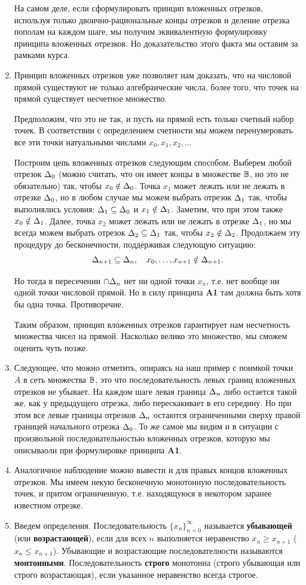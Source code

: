 \begin{enumerate}
На самом деле, если сформулировать принцип вложенных отрезков, используя только двоично-рациональные концы отрезков и деление отрезка пополам на каждом шаге, мы получим эквивалентную формулировку принципа вложенных отрезков. Но доказательство этого факта мы оставим за рамками курса.
\item Принцип вложенных отрезков уже позволяет нам доказать, что на числовой прямой существуют не только алгебраические числа, более того, что точек на прямой существует несчетное множество.

Предположим, что это не так, и пусть на прямой есть только счетный набор точек. В соответствии с определением счетности мы можем перенумеровать все эти точки натуальными числами $x_0,x_1,x_2,\dots$

Построим цепь вложенных отрезков следующим способом. Выберем любой отрезок $\Delta_0$ (можно считать, что он имеет концы в множестве $\mathbb B$, но это не обязательно) так, чтобы $x_0\notin\Delta_0$. Точка $x_1$ может лежать или не лежать в отрезке $\Delta_0$, но в любом случае мы можем выбрать отрезок $\Delta_1$ так, чтобы выполнялись условия: $\Delta_1\subseteq\Delta_0$ и $x_1\notin\Delta_1$. Заметим, что при этом также $x_0\notin\Delta_1$. Далее, точка $x_2$ может лежать или не лежать в отрезке $\Delta_1$, но мы всегда можем выбрать отрезок $\Delta_2\subseteq\Delta_1$ так, чтобы $x_2\notin\Delta_2$. Продолжаем эту процедуру до бесконечности, поддерживая следующую ситуацию:
$$
\Delta_{n+1}\subseteq\Delta_n,\quad x_0,\dots,x_{n+1}\notin\Delta_{n+1}.
$$

Но тогда в пересечении $\cap\Delta_n$ нет ни одной точки $x_n$, т.е. нет вообще ни одной точки числовой прямой. Но в силу принципа \textbf{A1} там должна быть хотя бы одна точка. Противоречие.

Таким образом, принцип вложенных отрезков гарантирует нам несчетность множества чисел на прямой. Насколько велико это множество, мы сможем оценить чуть позже.
\item Следующее, что можно отметить, опираясь на наш пример с поимкой точки $A$ в сеть множества $\mathbb B$, это что последовательность левых границ вложенных отрезков не убывает. На каждом шаге левая граница $\Delta_n$ либо остается такой же, как у предыдущего отрезка, либо перескакивает в его середину. Но при этом все левые границы отрезков $\Delta_n$ остаются ограниченными сверху правой границей начального отрезка $\Delta_0$. То же самое мы видим и в ситуации с произвольной последовательностью вложенных отрезков, которую мы описываоли при формулировке принципа \textbf{A1}.
\item Аналогичное наблюдение можно вывести и для правых концов вложенных отрезков. Мы имеем некую бесконечную монотонную последовательность точек, и притом ограниченную, т.е. находящуюся в некотором заранее известном отрезке.
\item Введем определения. Последовательность $\{x_n\}_{n=0}^\infty$ называется \textbf{убывающей} (или \textbf{возрастающей}), если для всех $n$ выполняется неравенство $x_n\ge x_{n+1}$ ($x_n\le x_{n+1}$). Убывающие и возрастающие последователности называются \textbf{монтонными}. Последовательность \textbf{строго} монотонна (строго убывающая или строго возрастающая), если указанное неравенство всегда строгое.


\end{enumerate}
